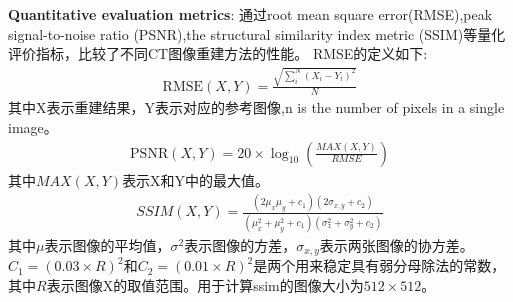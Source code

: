 \textbf{Quantitative evaluation metrics}: 通过root mean square error(RMSE),peak signal-to-noise ratio (PSNR)\cite{2008psnr},the structural similarity index metric (SSIM)\cite{2004ssim}等量化评价指标，比较了不同CT图像重建方法的性能。
RMSE的定义如下:
\begin{equation}
\begin{aligned}
\mathrm{RMSE}(X,Y) =  \frac{ \sqrt{\sum_{i}^N (X_i - Y_i)^2}}{N}   
\end{aligned}
\end{equation}
其中X表示重建结果，Y表示对应的参考图像,n is the number of pixels in a single image。
\begin{equation}
\begin{aligned}
\mathrm{PSNR}(X,Y) = 20\times\log_{10}(\frac{MAX(X,Y)}{RMSE})
\end{aligned}
\end{equation}
其中$MAX(X,Y)$表示X和Y中的最大值。
\begin{equation}
\begin{aligned}
SSIM(X,Y) = \frac{(2\mu_x\mu_y+c_1)(2\sigma_{x,y}+c_2)}{(\mu^2_x+\mu^2_y+c_1)(\sigma^2_x+\sigma^2_y+c_2)}
\end{aligned}
\end{equation}
其中$\mu$表示图像的平均值，$\sigma^2$表示图像的方差，$\sigma_{x,y}$表示两张图像的协方差。$C_1 = (0.03\times R)^2$和$C_2 = (0.01\times R)^2$是两个用来稳定具有弱分母除法的常数，其中$R$表示图像X的取值范围。用于计算ssim的图像大小为$512\times 512$。

